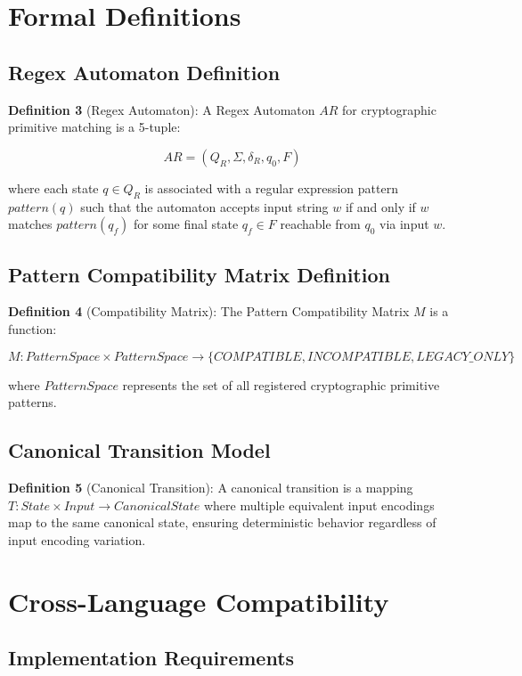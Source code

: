 \documentclass[11pt,a4paper]{article}
\begin{document}
\section{Formal Definitions}

\subsection{Regex Automaton Definition}

\textbf{Definition 3} (Regex Automaton): A Regex Automaton $AR$ for cryptographic primitive matching is a 5-tuple:

$$AR = (Q_R, \Sigma, \delta_R, q_0, F)$$

where each state $q \in Q_R$ is associated with a regular expression pattern $pattern(q)$ such that the automaton accepts input string $w$ if and only if $w$ matches $pattern(q_f)$ for some final state $q_f \in F$ reachable from $q_0$ via input $w$.

\subsection{Pattern Compatibility Matrix Definition}

\textbf{Definition 4} (Compatibility Matrix): The Pattern Compatibility Matrix $M$ is a function:

$$M: PatternSpace \times PatternSpace \rightarrow \{COMPATIBLE, INCOMPATIBLE, LEGACY\_ONLY\}$$

where $PatternSpace$ represents the set of all registered cryptographic primitive patterns.

\subsection{Canonical Transition Model}

\textbf{Definition 5} (Canonical Transition): A canonical transition is a mapping $T: State \times Input \rightarrow CanonicalState$ where multiple equivalent input encodings map to the same canonical state, ensuring deterministic behavior regardless of input encoding variation.

\section{Cross-Language Compatibility}

\subsection{Implementation Requirements}
\end{document}
